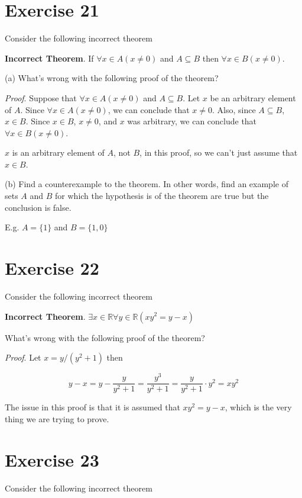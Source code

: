 \documentclass[11pt]{article}
\begin{document}
\section*{Exercise 21}

Consider the following incorrect theorem 

\textbf{Incorrect Theorem}. If $\forall x \in A(x \neq 0)$ and $A \subseteq B$
then $\forall x \in B(x \neq 0)$.

\noindent (a) What's wrong with the following proof of the theorem?

\textit{Proof}. Suppose that $\forall x \in A (x \neq 0)$ and $A \subseteq B$.
Let $x$ be an arbitrary element of $A$. Since $\forall x \in A (x \neq 0)$, we 
can conclude that $x \neq 0$. Also, since $A \subseteq B$, $x \in B$. 
Since $x \in B$, $x \neq 0$, and $x$ was arbitrary, we can conclude that
$\forall x \in B(x \neq 0)$.

$x$ is an arbitrary element of $A$, not $B$, in this proof, so we can't just 
assume that $x \in B$.

\noindent (b) Find a counterexample to the theorem. In other words, find an 
example of sets $A$ and $B$ for which the hypothesis is of the theorem are true 
but the conclusion is false.

E.g. $A = \{1\}$ and $B = \{1, 0\}$

\section*{Exercise 22}

Consider the following incorrect theorem

\textbf{Incorrect Theorem}. 
$\exists x \in \mathbb{R} \forall y \in \mathbb{R} (xy^2 = y - x)$

What's wrong with the following proof of the theorem?

\textit{Proof}. Let $x = y / (y^2 + 1)$ then 

$$y - x = 
y - \frac{y}{y^2 + 1} = 
\frac{y^3}{y^2 + 1} = 
\frac{y}{y^2 + 1} \cdot y^2 = 
xy^2$$

The issue in this proof is that it is assumed that $xy^2 = y - x$, which is the 
very thing we are trying to prove.

\section*{Exercise 23}

Consider the following incorrect theorem 
\end{document}
